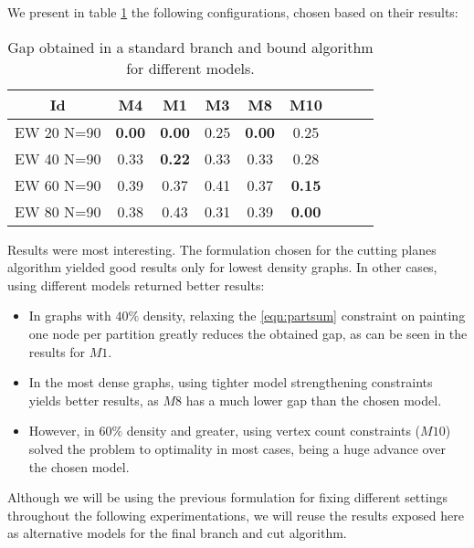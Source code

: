 We present in table \ref{table:models:bnb} the following configurations, chosen based on their results:

\begin{itemize}
\end{itemize}

\begin{table}
\label{table:models:bnb}
\centering

\begin{tabular}{|c|c|c|c|c|c|c|c|c|}
\hline
\multicolumn{1}{|c|}{Id} & \multicolumn{1}{|c|}{M4} & \multicolumn{1}{|c|}{M1} & \multicolumn{1}{|c|}{M3}  & \multicolumn{1}{|c|}{M8}  & \multicolumn{1}{|c|}{M10} 
\\
\hline
EW 20 N=90 & \textbf{0.00} & \textbf{0.00} & 0.25  & \textbf{0.00}  & 0.25
\\
EW 40 N=90 & 0.33 & \textbf{0.22} & 0.33 & 0.33 & 0.28 
\\
EW 60 N=90 & 0.39 & 0.37 & 0.41 & 0.37 & \textbf{0.15}
\\
EW 80 N=90 & 0.38 & 0.43 & 0.31 & 0.39 & \textbf{0.00}
\\
\hline 
 \end{tabular}

\caption{Gap obtained in a standard branch and bound algorithm for different models.}

\end{table}

Results were most interesting. The formulation chosen for the cutting planes algorithm yielded good results only for lowest density graphs. In other cases, using different models returned better results:
\begin{itemize}
\item In graphs with $40\%$ density, relaxing the \ref{eqn:partsum} constraint on painting one node per partition greatly reduces the obtained gap, as can be seen in the results for $M1$.
\item In the most dense graphs, using tighter model strengthening constraints yields better results, as $M8$ has a much lower gap than the chosen model.
\item However, in $60\%$ density and greater, using vertex count constraints ($M10$) solved the problem to optimality in most cases, being a huge advance over the chosen model.
\end{itemize}

Although we will be using the previous formulation for fixing different settings throughout the following experimentations, we will reuse the results exposed here as alternative models for the final branch and cut algorithm.

\clearpage